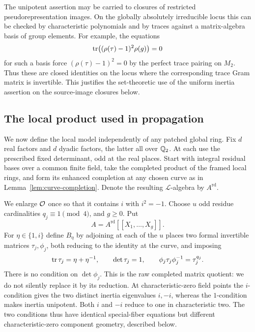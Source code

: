 The unipotent assertion may be carried to closures of restricted
pseudorepresentation images.  On the globally absolutely irreducible
locus this can be checked by characteristic polynomials and by
traces against a matrix-algebra basis of group elements.  For
example, the equations
\[
\operatorname{tr}\bigl((\rho(\tau)-1)^2\rho(g)\bigr)=0
\]
for such a basis force $(\rho(\tau)-1)^2=0$ by the perfect trace
pairing on $M_2$.  Thus these are closed identities on the locus
where the corresponding trace Gram matrix is invertible.  This
justifies the set-theoretic use of the uniform inertia assertion on
the source-image closures below.

\subsection{The local product used in propagation}

We now define the local model independently of any patched global
ring.  Fix $d$ real factors and $d$ dyadic factors, the latter all
over $\mathbb Q_2$.  At each use the prescribed fixed determinant, odd at
the real places.  Start with integral residual bases over a common
finite field, take the completed product of the framed local rings,
and form its enhanced completion at any chosen curve as in
Lemma~\ref{lem:curve-completion}.  Denote the resulting
$\mathcal L$-algebra by $A^{\mathrm{rd}}$.

We enlarge $\mathcal O$ once so that it contains $i$ with $i^2=-1$.
Choose $u$ odd residue cardinalities $q_j\equiv1\pmod4$, and $g\ge0$.
Put
\[
A=A^{\mathrm{rd}}[[X_1,\ldots,X_g]].
\]
For $\eta\in\{1,i\}$ define $B_\eta$ by adjoining at each of the $u$
places two formal invertible matrices $\tau_j,\phi_j$, both reducing
to the identity at the curve, and imposing
\begin{equation}\label{eq:tame-model}
\operatorname{tr}\tau_j=\eta+\eta^{-1},\qquad
\det\tau_j=1,\qquad
\phi_j\tau_j\phi_j^{-1}=\tau_j^{q_j}.
\end{equation}
There is no condition on $\det\phi_j$.  This is the raw completed
matrix quotient: we do not silently replace it by its reduction.
At characteristic-zero field points the $i$-condition gives the two
distinct inertia eigenvalues $i,-i$, whereas the $1$-condition makes
inertia unipotent. Both $i$ and $-i$ reduce to one in characteristic
two. The two conditions thus have identical special-fiber equations
but different characteristic-zero component geometry, described below.

